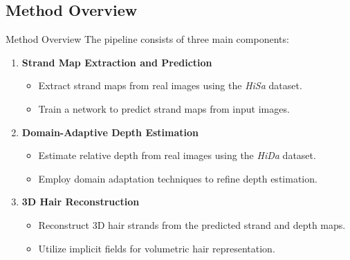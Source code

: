 \subsection{Method Overview}
\begin{frame}[t]{Method Overview}
    The pipeline consists of three main components:
    \begin{enumerate}
        \item \textbf{Strand Map Extraction and Prediction}
        \begin{itemize}
            \item Extract strand maps from real images using the \emph{HiSa} dataset.
            \item Train a network to predict strand maps from input images.
        \end{itemize}

        \item \textbf{Domain-Adaptive Depth Estimation}
        \begin{itemize}
            \item Estimate relative depth from real images using the \emph{HiDa} dataset.
            \item Employ domain adaptation techniques to refine depth estimation.
        \end{itemize}

        \item \textbf{3D Hair Reconstruction}
        \begin{itemize}
            \item Reconstruct 3D hair strands from the predicted strand and depth maps.
            \item Utilize implicit fields for volumetric hair representation.
        \end{itemize}
    \end{enumerate}
\end{frame}
